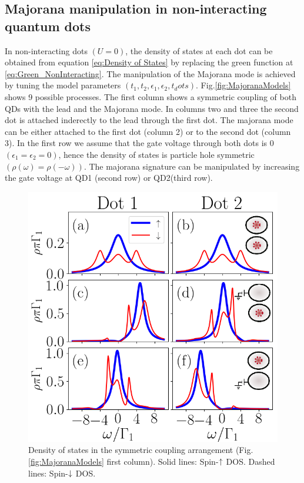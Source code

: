 \documentclass[showpacs,aps,prb,reprint,superscriptaddress]{revtex4-1}
\begin{document}
     \subsection{Majorana manipulation in non-interacting quantum dots}
     In non-interacting dots $(U=0)$, the density of states at each dot can be obtained from equation \eqref{eq:Density of States} by replacing the green function at \eqref{eq:Green_NonInteracting}. The manipulation of the Majorana mode is achieved by  tuning the model parameters $(t_1,t_2, \epsilon_1 , \epsilon_2 , t_dots)$. Fig.\ref{fig:MajoranaModels} shows 9 possible processes. The first column shows a symmetric coupling of both QDs with the lead and the Majorana mode. In columns two and three the second dot is attached inderectly to the lead through the first dot. The majorana mode can be either attached to the first dot (column 2) or to the second dot (column 3). In the first row we assume that the gate voltage through both dots is $0$ $(\epsilon_1 = \epsilon_2 = 0)$, hence the density of states is particle hole symmetric $(\rho(\omega) = \rho(-\omega))$. The majorana signature can be manipulated by increasing the gate voltage at QD1 (second row) or QD2(third row). 
     
\begin{figure}[bt]
\begin{center}
\includegraphics[scale=0.48]{Graficos/t1=t2.png}
\caption{ \label{fig:SymCoupling}  Density of states in the symmetric coupling arrangement (Fig.\ref{fig:MajoranaModels} first column). Solid lines: Spin-$\uparrow$ DOS. Dashed lines: Spin-$\downarrow$ DOS.  
}
%
\label{fig:GenModel}
\end{center}
\end{figure}
     
\end{document}
